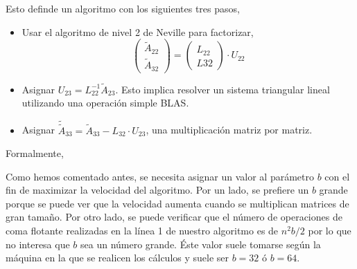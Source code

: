 \documentclass[a4paper,12pt]{article}
\begin{document}
Esto definde un algoritmo con los siguientes tres pasos, 

\begin{itemize}
	\item Usar el algoritmo de nivel 2 de Neville para factorizar,
	$$\begin{pmatrix} \widetilde{A}_{22}\\ \widetilde{A}_{32} 
\end{pmatrix} = \begin{pmatrix} L_{22} \\ L{32} \end{pmatrix} \cdot U_{22}$$
	\item Asignar $U_{23} = L_{22}^{-1} \widetilde{A}_{23}$. Esto implica resolver un sistema triangular lineal utilizando una operaci\'on simple BLAS.
	\item Asignar $\widetilde{\widetilde{A}}_{33} = \widetilde{A}_{33} - L_{32}\cdot U_{23}$, una multiplicaci\'on matriz por matriz.
\end{itemize}

\bigskip

Formalmente,

\begin{algorithmic}[1]\label{neville3}
	\ENDFOR
\end{algorithmic}

\bigskip

Como hemos comentado antes, se necesita asignar un valor al par\'ametro $b$ con el fin de maximizar la velocidad del algoritmo. Por un lado, se prefiere un $b$ grande porque se puede ver que la velocidad aumenta cuando se multiplican matrices de gran tama\~no. Por otro lado, se puede verificar que el n\'umero de operaciones de coma flotante realizadas en la l\'inea 1 de nuestro algoritmo es de $n^2 b/2$ por lo que no interesa que $b$ sea un n\'umero grande. \'Este valor suele tomarse seg\'un la m\'aquina en la que se realicen los c\'alculos y suele ser $b=32$ \'o $b=64$.

	  
\end{document}
